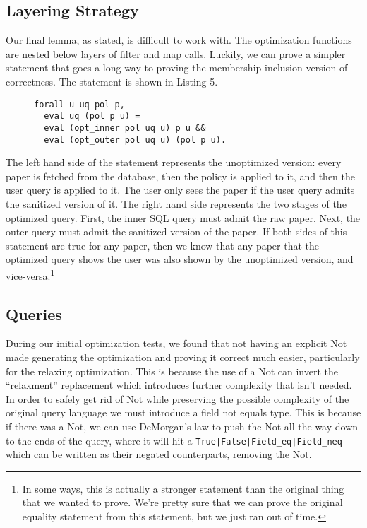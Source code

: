 \documentclass[11pt,journal]{IEEEtran}
\begin{document}
\subsection{Layering Strategy}
\label{sec:layering}
Our final lemma, as stated, is difficult to work with.  The optimization functions are nested below layers of filter and map calls.  Luckily, we can prove a simpler statement that goes a long way to proving the membership inclusion version of correctness.  The statement is shown in Listing 5.
\begin{figure}
\begin{lstlisting}[caption=Simplified statement of correctness for optimizations.]
forall u uq pol p,
  eval uq (pol p u) =
  eval (opt_inner pol uq u) p u &&
  eval (opt_outer pol uq u) (pol p u).
\end{lstlisting}
\end{figure}
The left hand side of the statement represents the unoptimized version: every paper is fetched from the database, then the policy is applied to it, and then the user query is applied to it.  The user only sees the paper if the user query admits the sanitized version of it.  The right hand side represents the two stages of the optimized query.  First, the inner SQL query must admit the raw paper.  Next, the outer query must admit the sanitized version of the paper.  If both sides of this statement are true for any paper, then we know that any paper that the optimized query shows the user was also shown by the unoptimized version, and vice-versa.\footnote{In some ways, this is actually a stronger statement than the original thing that we wanted to prove.  We're pretty sure that we can prove the original equality statement from this statement, but we just ran out of time.}

\subsection{Queries}
\label{sec:queries}
During our initial optimization tests, we found that not having an explicit Not made generating the optimization and proving it correct much easier, particularly for the relaxing optimization. This is because the use of a Not can invert the ``relaxment'' replacement which introduces further complexity that isn't needed. In order to safely get rid of Not while preserving the possible complexity of the original query language we must introduce a field not equals type. This is because if there was a Not, we can use DeMorgan's law to push the Not all the way down to the ends of the query, where it will hit a \texttt{True|False|Field\_eq|Field\_neq} which can be written as their negated counterparts, removing the Not. 
\end{document}
